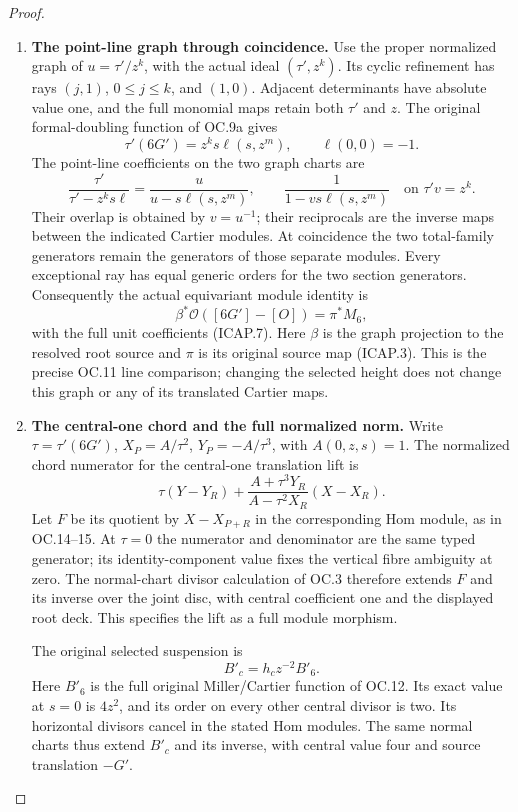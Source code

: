 \begin{proof}
\begin{enumerate}[label=\arabic*.]
\item \textbf{The point-line graph through coincidence.}
Use the proper normalized graph of \(u=\tau'/z^k\), with
the actual ideal \((\tau',z^k)\). Its cyclic refinement has
rays \((j,1)\), \(0\leq j\leq k\), and \((1,0)\).
Adjacent determinants have absolute value one, and the full
monomial maps retain both \(\tau'\) and \(z\). The original
formal-doubling function of OC.9a gives
\[
 \tau'(6G')=z^k s\ell(s,z^m),\qquad \ell(0,0)=-1.
\]
The point-line coefficients on the two graph charts are
\[
 \frac{\tau'}{\tau'-z^k s\ell}
       =\frac{u}{u-s\ell(s,z^m)},\qquad
 \frac1{1-vs\ell(s,z^m)}\quad\text{on }\tau'v=z^k.
 \tag{ICAP.7}
\]
Their overlap is obtained by \(v=u^{-1}\); their reciprocals
are the inverse maps between the indicated Cartier modules.
At coincidence the two total-family generators remain the
generators of those separate modules. Every exceptional ray
has equal generic orders for the two section generators.
Consequently the actual equivariant module identity is
\[
 \beta^*\mathcal O([6G']-[O])=\pi^*M_6,                 \tag{ICAP.8}
\]
with the full unit coefficients (ICAP.7). Here \(\beta\) is
the graph projection to the resolved root source and \(\pi\)
is its original source map (ICAP.3). This is the precise
OC.11 line comparison; changing the selected height does not
change this graph or any of its translated Cartier maps.

\item \textbf{The central-one chord and the full normalized norm.}
Write \(\tau=\tau'(6G')\),
\(X_P=A/\tau^2\), \(Y_P=-A/\tau^3\), with
\(A(0,z,s)=1\). The normalized chord numerator for the
central-one translation lift is
\[
 \tau(Y-Y_R)+
 \frac{A+\tau^3Y_R}{A-\tau^2X_R}(X-X_R).                \tag{ICAP.9}
\]
Let \(F\) be its quotient by \(X-X_{P+R}\) in the
corresponding Hom module, as in OC.14--15. At \(\tau=0\)
the numerator and denominator are the same typed generator;
its identity-component value fixes the vertical fibre
ambiguity at zero. The normal-chart divisor calculation of
OC.3 therefore extends \(F\) and its inverse over the
joint disc, with central coefficient one and the displayed
root deck. This specifies the lift as a full module morphism.

The original selected suspension is
\[
 B'_c=h_c z^{-2}B'_6.                                   \tag{ICAP.10}
\]
Here \(B'_6\) is the full original Miller/Cartier function
of OC.12. Its exact value at \(s=0\) is \(4z^2\), and
its order on every other central divisor is two. Its horizontal
divisors cancel in the stated Hom modules. The same normal
charts thus extend \(B'_c\) and its inverse, with central
value four and source translation \(-G'\).


\end{enumerate}
\end{proof}
